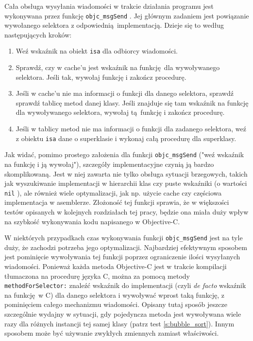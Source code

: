 \documentclass[mgr, shortabstract]{iithesis}
\newcommand{\objcinline}[1]{
    \texttt{#1}
}
\begin{document}
Cała obsługa wysyłania wiadomości w trakcie działania programu jest wykonywana przez funkcję \objcinline{objc_msgSend}. Jej głównym zadaniem jest powiązanie wywołanego selektora z odpowiednią implementacją. Dzieje się to według następujących kroków:

\begin{enumerate}
    \item Weź wskaźnik na obiekt \objcinline{isa} dla odbiorcy wiadomości.
    \item Sprawdź, czy w cache'u jest wskaźnik na funkcję dla wywoływanego selektora. Jeśli tak, wywołaj funkcję i zakończ procedurę.
    \item Jeśli w cache'u nie ma informacji o funkcji dla danego selektora, sprawdź sprawdź tablicę metod danej klasy. Jeśli znajduje się tam wskaźnik na funkcję dla wywoływanego selektora, wywołaj tą funkcję i zakończ procedurę.
    \item Jeśli w tablicy metod nie ma informacji o funkcji dla zadanego selektora, weź z obiektu \objcinline{isa} dane o superklasie i wykonaj całą procedurę dla superklasy.
\end{enumerate}

Jak widać, pomimo prostego założenia dla funkcji \objcinline{objc_msgSend} ("weź wskaźnik na funkcję i ją wywołaj"), szczegóły implementacyjne czynią ją bardzo skomplikowaną. Jest w niej zawarta nie tylko obsługa sytuacji brzegowych, takich jak wyszukiwanie implementacji w hierarchii klas czy puste wskaźniki (o wartości \objcinline{nil}), ale również wiele optymalizacji, jak np. użycie cache czy częściowa implementacja w asemblerze. Złożoność tej funkcji sprawia, że w większości testów opisanych w kolejnych rozdziałach tej pracy, będzie ona miała duży wpływ na szybkość wykonywania kodu napisanego w Objective-C.

W niektórych przypadkach czas wykonywania funkcji \objcinline{objc_msgSend} jest na tyle duży, że zachodzi potrzeba jego optymalizacji. Najbardziej efektywnym sposobem jest pominięcie wywoływania tej funkcji poprzez ograniczenie ilości wysyłanych wiadomości. Ponieważ każda metoda Objective-C jest w trakcie kompilacji tłumaczona na procedurę języka C, można za pomocą metody \objcinline{methodForSelector:} znaleźć wskaźnik do implementacji (czyli \textit{de facto} wskaźnik na funkcję w C) dla danego selektora i wywoływać wprost taką funkcję, z pominięciem całego mechanizmu wiadomości. Opisany tutaj sposób jeszcze szczególnie wydajny w sytuacji, gdy pojedyncza metoda jest wywoływana wiele razy dla różnych instancji tej samej klasy (patrz test \ref{s:bubble_sort}). Innym sposobem może być używanie zwykłych zmiennych zamiast właściwości.
\end{document}
